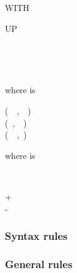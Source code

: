 \begin{syntax}[\miscextcolour]
  WITH 
  \begin{1=}
    UP \\
  \end{1=}
  \begin{0-1}
    \begin{1=}
      \identifier \\
      \integer
    \end{1=}
    \begin{1=}
       \\
    \end{1=}
  \end{0-1}
\end{syntax}

where  is

\begin{syntax}[\miscextcolour]
  \begin{1=}
    (\ \ ,\ \ ) \\
    (\ ,\ \ ) \\
    (\ \ ,\ )
  \end{1=}
\end{syntax}

where  is

\begin{syntax}[\miscextcolour]
  \begin{1=}
    \identifier \\
    \literal
  \end{1=}
  \begin{0-1}
    \begin{1=}
      + \\
      -
    \end{1=}
    \literal
  \end{0-1}
\end{syntax}

\subsubsection{Syntax rules}

\subsubsection{General rules}

